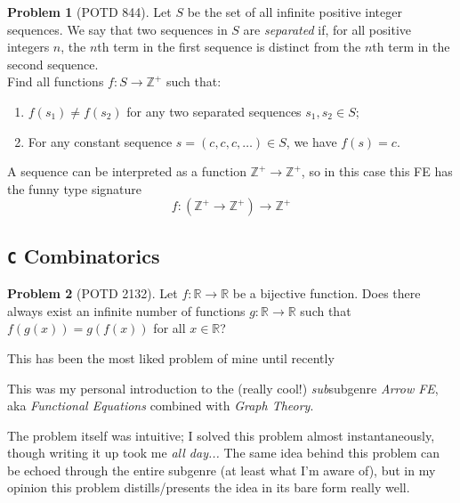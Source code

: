 \documentclass[11pt]{article} %
\theoremstyle{definition}
\newtheorem{problem}{Problem}
\theoremstyle{remark}
\begin{document}
\begin{problem}[POTD 844]
    Let \(S\) be the set of all infinite positive integer sequences. We say that two sequences in \(S\) are \emph{separated} if, for all positive integers \(n\), the \(n\)th term in the first sequence is distinct from the \(n\)th term in the second sequence. \\

    Find all functions \(f:S\to \mathbb{Z}^+\) such that:
    \begin{enumerate}[label=(\roman*)]
        \item \(f(s_1)\neq f(s_2)\) for any two separated sequences \(s_1,s_2\in S\);
        \item For any constant sequence \(s=(c,c,c,\dots)\in S\), we have \(f(s)=c\). 
    \end{enumerate}
    \begin{talks}
        \begin{talk}
            A sequence can be interpreted as a function \(\mathbb{Z}^+ \rightarrow \mathbb{Z}^+\), so in this case this FE has the funny type signature
            \[f: (\mathbb{Z}^+ \rightarrow \mathbb{Z}^+) \rightarrow \mathbb{Z}^+\]
        \end{talk}
    \end{talks}
\end{problem}

\subsection{\texttt{C} Combinatorics}
\setcounter{problem}{0}

\begin{problem}[POTD 2132]
    Let \(f \colon \mathbb{R} \to \mathbb{R}\) be a bijective function. Does there always exist an infinite number of functions \(g \colon \mathbb{R} \to \mathbb{R}\) such that \(f(g(x))=g(f(x))\) for all \(x \in \mathbb{R}\)?
    \begin{talks}
        \begin{talk}
            This has been the most liked problem of mine until recently 
        \end{talk}
        \begin{talk}
            This was my personal introduction to the (really cool!) \emph{sub}subgenre \emph{Arrow FE}, aka \emph{Functional Equations} combined with \emph{Graph Theory}.

            The problem itself was intuitive; I solved this problem almost instantaneously, though writing it up took me \emph{all day...} The same idea behind this problem can be echoed through the entire subgenre (at least what I'm aware of), but in my opinion this problem distills/presents the idea in its bare form really well.
        \end{talk}
    \end{talks}
\end{problem}
\end{document}
